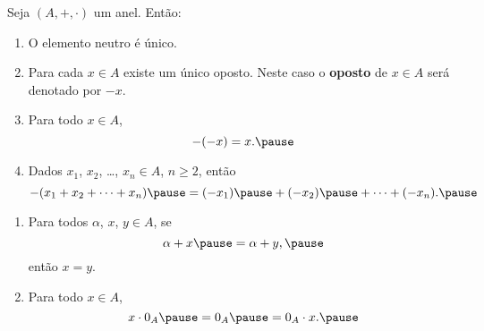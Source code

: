 \documentclass{beamer}
\begin{document}
    \begin{frame}
        \begin{proposicao}
            Seja $(A, + , \cdot)$ um anel. \pause Então:\pause
            \begin{enumerate}[label={\roman*})]
                \item O elemento neutro é único.\pause

                \vspace{.5cm}

                \item Para cada $x \in A$ \pause existe um único
                    oposto. \pause Neste caso o \textbf{oposto} de
                    $x \in A$ \pause será denotado por $-x$.\pause

                \vspace{.5cm}

                \item Para todo $x \in A$, \pause
                \[
                    -(-x) = x.\pause
                \]

                \vspace{.5cm}

                \item Dados $x_{1}$, \pause $x_{2}$, \pause \dots,
                    $x_n \in A$, \pause $n \geqslant 2$, \pause
                    então\pause
                \[
                    -(x_1 + x_2 + \dots + x_n) \pause = (-x_1) \pause
                    + (-x_2) \pause + \dots + (-x_n).\pause
                \]

                \vspace{.2cm}

                \seti
            \end{enumerate}
        \end{proposicao}
    \end{frame}

    \begin{frame}
        \begin{proposicao}
            \begin{enumerate}[label={\roman*})]
                \conti

                \item Para todos $\alpha$, \pause $x$, \pause $y \in A$, \pause se
                \[
                    \alpha + x \pause = \alpha + y,\pause
                \]
                então $x = y$.\pause

                \vspace{.5cm}

                \item Para todo $x \in A$, \pause
                \[
                    x\cdot 0_A \pause = 0_A \pause = 0_A\cdot x.\pause
                \]

                \vspace{.5cm}
            \end{enumerate}
        \end{proposicao}
    \end{frame}
\end{document}
